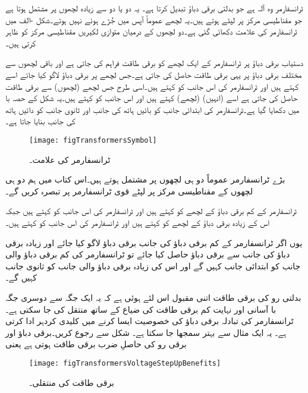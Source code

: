 ٹرانسفارمر وہ آلہ ہے جو بدلتی برقی دباؤ تبدیل کرتا ہے۔ یہ دو یا دو سے زیادہ لچھوں پر مشتمل ہوتا ہے جو مقناطیسی مرکز پر لپٹے ہوتے ہیں۔یہ لچھے عموماً آپس میں جُڑے ہوئے نہیں ہوتے۔شکل -الف میں ٹرانسفارمر کی علامت دکھائی گئی ہے۔دو لچھوں کے درمیان متوازی لکیریں مقناطیسی مرکز کو ظاہر کرتی ہیں۔

دستیاب برقی دباؤ پر ٹرانسفارمر کے ایک لچھے کو برقی طاقت فراہم کی جاتی ہے اور باقی لچھوں سے  مختلف برقی دباؤ پر یہی برقی طاقت حاصل کی جاتی ہے۔جس لچھے پر برقی دباؤ لاگو کیا جائے اسے   کہتے ہیں اور ٹرانسفارمر کی اس جانب کو  کہتے ہیں۔اسی طرح جس لچھے (لچھوں) سے برقی طاقت حاصل کی جاتی ہے اسے (انہیں)   (لچھے) کہتے ہیں اور اس جانب کو   کہتے ہیں۔یہ شکل کے حصہ با میں دکھایا گیا ہے۔ٹرانسفارمر کی ابتدائی جانب کو بائیں ہاتھ کی جانب اور ثانوی جانب کو دائیں ہاتھ کی جانب بنایا جاتا ہے۔
\begin{figure}
\centering
\texttt{[image: figTransformersSymbol]}
\caption{ٹرانسفارمر کی علامت۔}
\label{شکل_ٹرانسفارمر_علامت}
\end{figure}

بڑے ٹرانسفارمر عموماً دو ہی لچھوں پر مشتمل ہوتے ہیں۔اس کتاب میں ہم دو ہی لچھوں کے مقناطیسی مرکز پر لپٹے قوی ٹرانسفارمر پر تبصرہ کریں گے۔

	ٹرانسفارمر کے کم برقی دباؤ کے لچھے کو   کہتے ہیں اور ٹرانسفارمر کی اس جانب کو   کہتے ہیں جبکہ اس کے زیادہ برقی دباؤ کے لچھے کو   کہتے ہیں اور ٹرانسفارمر کی اس جانب کو   کہتے ہیں۔

یوں اگر ٹرانسفارمر کے کم برقی دباؤ کی جانب برقی دباؤ لاگو کیا جائے اور زیادہ برقی دباؤ کی جانب سے برقی دباؤ حاصل کیا جائے تو ٹرانسفارمر کی کم برقی دباؤ والی جانب کو ابتدائی جانب کہیں گے اور اس کی زیادہ برقی دباؤ والی جانب کو ثانوی جانب کہیں گے۔

بدلتی رو کی برقی طاقت اتنی مقبول اس لئے ہوئی ہے کہ یہ ایک جگہ سے دوسری جگہ با آسانی اور نہایت کم برقی طاقت کی ضیاع کے ساتھ منتقل کی جا سکتی ہے۔ٹرانسفارمر کی تبادلہ برقی دباؤ کی خصوصیت ایسا کرنے میں کلیدی کردہر ادا کرتی ہے۔ یہ ایک مثال سے بہتر سمجھا جا سکتا ہے۔
%
شکل   سے رجوع کریں۔برقی دباؤ اور برقی رو کی حاصلِ ضرب برقی طاقت ہوتی ہے یعنی
\begin{figure}
\centering
\texttt{[image: figTransformersVoltageStepUpBenefits]}
\caption{برقی طاقت کی منتقلی۔}
\label{شکل_ٹرانسفارمر_برقی_طاقت_منتقلی}
\end{figure}

